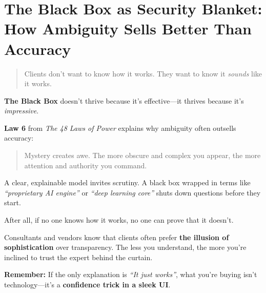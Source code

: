 \section{The Black Box as Security Blanket: How Ambiguity Sells Better Than Accuracy}

\begin{quote}
Clients don’t want to know how it works. They want to know it \textit{sounds} like it works.
\end{quote}

  \textbf{The Black Box} doesn’t thrive because it’s effective—it thrives because it’s \textit{impressive}.
  
  \medskip
  
  \textbf{Law 6} from \textit{The 48 Laws of Power} explains why ambiguity often outsells accuracy:
  \begin{quote}
  Mystery creates awe. The more obscure and complex you appear, the more attention and authority you command.
  \end{quote}
  
  \medskip
  
  A clear, explainable model invites scrutiny. A black box wrapped in terms like \textit{``proprietary AI engine''} or \textit{``deep learning core''} shuts down questions before they start.
  
  \medskip
  
  After all, if no one knows how it works, no one can prove that it doesn’t.
  
  \medskip
  
  Consultants and vendors know that clients often prefer \textbf{the illusion of sophistication} over transparency.  The less you understand, the more you're inclined to trust the expert behind the curtain.
  
  \medskip
  
  \textbf{Remember:} If the only explanation is \textit{``It just works''}, what you're buying isn’t technology—it’s a \textbf{confidence trick in a sleek UI}.
  





